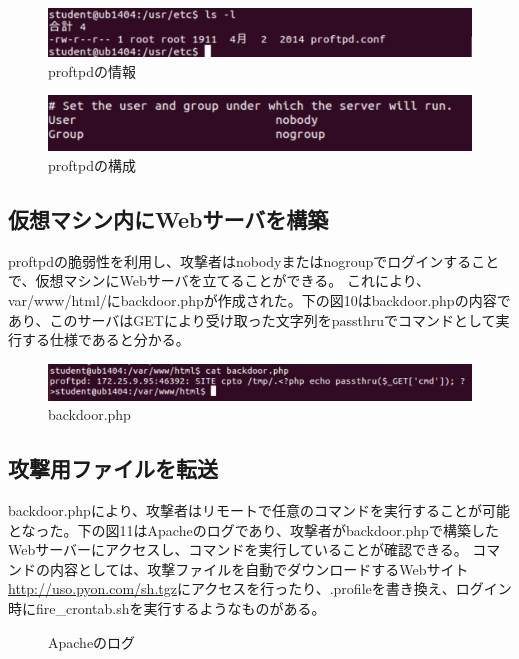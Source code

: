 \documentclass[dvipdfmx,autodetect-engine,titlepage]{jsarticle}
\begin{document}
\begin{figure}[H]
  \centering
  \includegraphics[scale=0.54]{in10.png}
  \caption{proftpdの情報}\label{fig:図10}
\end{figure}

\begin{figure}[H]
  \centering
  \includegraphics[scale=0.45]{in11.png}
  \caption{proftpdの構成}\label{fig:図11}
\end{figure}

\subsection{仮想マシン内にWebサーバを構築}
proftpdの脆弱性を利用し、攻撃者はnobodyまたはnogroupでログインすることで、仮想マシンにWebサーバを立てることができる。
これにより、var/www/html/にbackdoor.phpが作成された。下の図10はbackdoor.phpの内容であり、このサーバはGETにより受け取った文字列をpassthruでコマンドとして実行する仕様であると分かる。\\

\begin{figure}[H]
  \centering
  \includegraphics[scale=0.5]{in12.png}
  \caption{backdoor.php}\label{fig:図12}
\end{figure}

\subsection{攻撃用ファイルを転送}
backdoor.phpにより、攻撃者はリモートで任意のコマンドを実行することが可能となった。下の図11はApacheのログであり、攻撃者がbackdoor.phpで構築したWebサーバーにアクセスし、コマンドを実行していることが確認できる。
コマンドの内容としては、攻撃ファイルを自動でダウンロードするWebサイト\url{http://uso.pyon.com/sh.tgz}にアクセスを行ったり、.profileを書き換え、ログイン時にfire\_crontab.shを実行するようなものがある。\\
\begin{figure}[H]
  \centering
  \caption{Apacheのログ}\label{fig:図13}
\end{figure}
\end{document}
